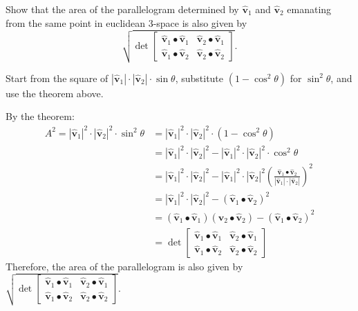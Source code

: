 \documentclass[newpage,hints,handout,nooutcomes,noauthor,12pt]{ximera}
\begin{document}
\begin{problem}
\label{9}Show that the area of the parallelogram determined by $\hat{\mathbf v}_{1}$
and $\hat{\mathbf v}_{2}$ emanating from the same point in euclidean $3$-space is also
given by%
\[
\sqrt{\det
\begin{bmatrix}
\hat{\mathbf v}_{1}\bullet\hat{\mathbf v}_{1} & \hat{\mathbf v}_{2}\bullet\hat{\mathbf v}_{1}\\
\hat{\mathbf v}_{1}\bullet\hat{\mathbf v}_{2} & \hat{\mathbf v}_{2}\bullet\hat{\mathbf v}_{2}%
\end{bmatrix}}.
\]

\begin{hint}
Start from the square of
$|\hat{\mathbf v}_{1}|\cdot|\hat{\mathbf v}_{2}|\cdot\sin\theta$, substitute
$(1-\cos^{2}\theta)$ for $\sin^{2}\theta$, and use the theorem above.
\end{hint}

\begin{freeResponse}
By the theorem:
\begin{align*}
A^2 = |\hat{\mathbf v}_{1}|^2 \cdot |\hat{\mathbf v}_{2} |^2 \cdot\sin^{2}\theta 
&= |\hat{\mathbf v}_{1}|^2 \cdot |\hat{\mathbf v}_{2} |^2 \cdot \left(1- \cos^{2}\theta\right)\\
&= |\hat{\mathbf v}_{1}|^2 \cdot |\hat{\mathbf v}_{2} |^2 - |\hat{\mathbf v}_{1}|^2 \cdot |\hat{\mathbf v}_{2} |^2 \cdot\cos^{2}\theta \\
&= |\hat{\mathbf v}_{1}|^2 \cdot |\hat{\mathbf v}_{2} |^2 - |\hat{\mathbf v}_{1}|^2 \cdot |\hat{\mathbf v}_{2} |^2 \left(  \frac{\hat{\mathbf v}_{1}\bullet\hat{\mathbf v}_{2}}{\left\vert \hat{\mathbf v}_{1}\right\vert \cdot\left\vert \hat{\mathbf v}_{2}\right\vert}\right)^2\\
&= |\hat{\mathbf v}_{1}|^2 \cdot |\hat{\mathbf v}_{2} |^2 - \left(\hat{\mathbf v}_{1}\bullet\hat{\mathbf v}_{2}\right)^2\\
&= \left(\hat{\mathbf v}_{1}\bullet\hat{\mathbf v}_{1}\right) \left(\hat{\mathbf v}_{2}\bullet\hat{\mathbf v}_{2}\right) - \left(\hat{\mathbf v}_{1}\bullet\hat{\mathbf v}_{2}\right)^2\\
&=\det
    \begin{bmatrix}
      \hat{\mathbf v}_{1}\bullet\hat{\mathbf v}_{1} & \hat{\mathbf v}_{2}\bullet\hat{\mathbf v}_{1}\\
      \hat{\mathbf v}_{1}\bullet\hat{\mathbf v}_{2} & \hat{\mathbf v}_{2}\bullet\hat{\mathbf v}_{2}
    \end{bmatrix}
\end{align*}
Therefore, the area of the parallelogram is also given by
$\sqrt{\det
    \begin{bmatrix}
      \hat{\mathbf v}_{1}\bullet\hat{\mathbf v}_{1} & \hat{\mathbf v}_{2}\bullet\hat{\mathbf v}_{1}\\
      \hat{\mathbf v}_{1}\bullet\hat{\mathbf v}_{2} & \hat{\mathbf v}_{2}\bullet\hat{\mathbf v}_{2}
    \end{bmatrix}}$.


\end{freeResponse}
\end{problem}
\end{document}
